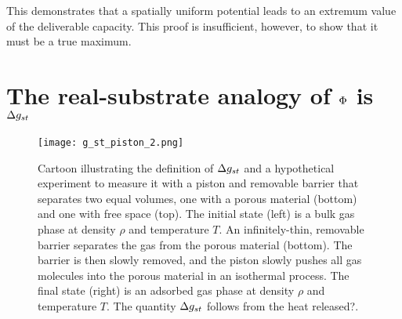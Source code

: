 This demonstrates that a spatially uniform potential leads to an extremum value
of the deliverable capacity. This proof is insufficient, however, to show that
it must be a true maximum.

\section{The real-substrate analogy of $\Phi$ is $\Delta g_{st}$}
\label{sec:phi-is-delta-g}
\begin{figure}
    \centering
    \texttt{[image: g\_st\_piston\_2.png]}
    \caption{Cartoon illustrating the definition of $\Delta g_{st}$ and a hypothetical experiment to measure it with a piston and removable barrier that separates two equal volumes, one with a porous material (bottom) and one with free space (top). The initial state (left) is a bulk gas phase at density $\rho$ and temperature $T$. An infinitely-thin, removable barrier separates the gas from the porous material (bottom). The barrier is then slowly removed, and the piston slowly pushes all gas molecules into the porous material in an isothermal process. The final state (right) is an adsorbed gas phase at density $\rho$ and temperature $T$. The quantity $\Delta g_{st}$ follows from {\color{red} the heat released?}.}
    \label{fig:delta-G-cartoon}
\end{figure}

